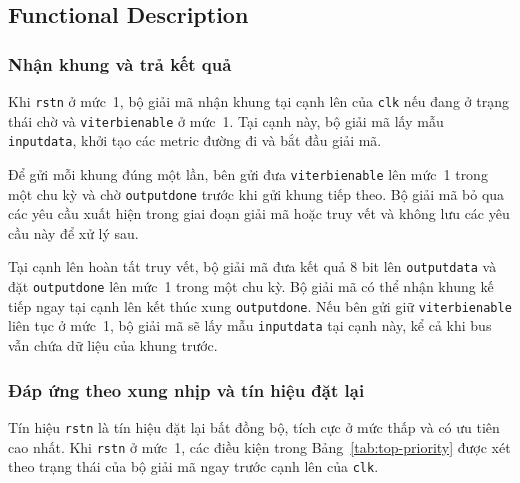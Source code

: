 \documentclass[12pt,a4paper]{article}
\renewcommand{\_}{\originalunderscore\allowbreak}
\begin{document}
\subsection{Functional Description}

\subsubsection{Nhận khung và trả kết quả}

Khi \texttt{rstn} ở mức~1, bộ giải mã nhận khung tại cạnh lên của
\texttt{clk} nếu đang ở trạng thái chờ và \texttt{viterbi\_enable}
ở mức~1. Tại cạnh này, bộ giải mã lấy mẫu \texttt{input\_data},
khởi tạo các metric đường đi và bắt đầu giải mã.

Để gửi mỗi khung đúng một lần,
bên gửi đưa \texttt{viterbi\_enable} lên mức~1 trong một chu kỳ và
chờ \texttt{output\_done} trước khi gửi khung tiếp theo. Bộ giải mã
bỏ qua các yêu cầu xuất hiện trong giai đoạn giải mã hoặc truy vết
và không lưu các yêu cầu này để xử lý sau.

Tại cạnh lên hoàn tất truy vết, bộ giải mã đưa kết quả 8 bit lên
\texttt{output\_data} và đặt \texttt{output\_done} lên mức~1 trong
một chu kỳ. Bộ giải mã có thể nhận khung kế tiếp ngay tại cạnh lên
kết thúc xung \texttt{output\_done}. Nếu bên gửi giữ
\texttt{viterbi\_enable} liên tục ở mức~1, bộ giải mã sẽ lấy mẫu
\texttt{input\_data} tại cạnh này, kể cả khi bus vẫn chứa dữ liệu
của khung trước.

\subsubsection{Đáp ứng theo xung nhịp và tín hiệu đặt lại}

Tín hiệu \texttt{rstn} là tín hiệu đặt lại bất đồng bộ, tích cực
ở mức thấp và có ưu tiên cao nhất. Khi \texttt{rstn} ở mức~1,
các điều kiện trong Bảng~\ref{tab:top-priority} được xét theo
trạng thái của bộ giải mã ngay trước cạnh lên của \texttt{clk}.
\end{document}
